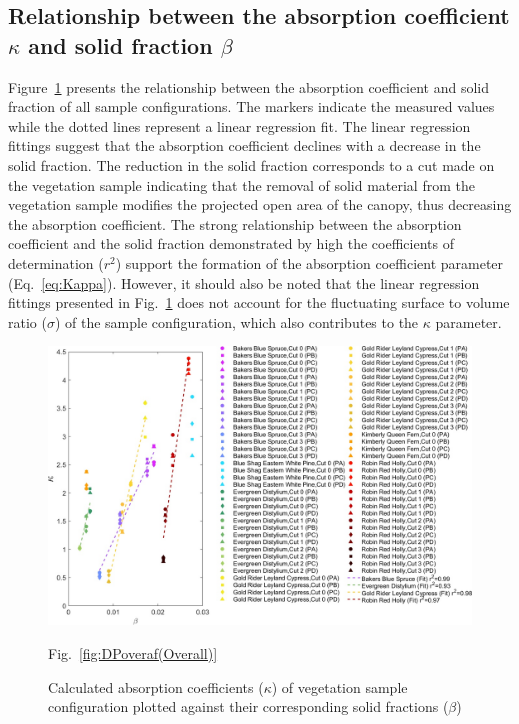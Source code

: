 \documentclass[12pt]{article}
\begin{document}
\subsection{Relationship between the absorption coefficient $\kappa$ and solid fraction $\beta$ }

Figure~\ref{fig:betavkappa} presents the relationship between the absorption coefficient and solid fraction of all sample configurations. The markers indicate the measured values while the dotted lines represent a linear regression fit. The linear regression fittings suggest that the absorption coefficient declines with a decrease in the solid fraction. The reduction in the solid fraction corresponds to a cut made on the vegetation sample indicating that the removal of solid material from the vegetation sample modifies the projected open area of the canopy, thus decreasing the absorption coefficient. The strong relationship between the absorption coefficient and the solid fraction demonstrated by high the coefficients of determination ($r^2$) support the formation of the absorption coefficient parameter (Eq.~\ref{eq:Kappa}). However, it should also be noted that the linear regression fittings presented in Fig.~\ref{fig:betavkappa} does not account for the fluctuating surface to volume ratio ($\sigma$) of the sample configuration, which also contributes to the $\kappa$ parameter.

\begin{figure}
	\centering 	\includegraphics[width=1.1\linewidth]{Picture12.jpg}
	\caption{Calculated absorption coefficients ($\kappa$) of vegetation sample configuration plotted against their corresponding solid fractions ($\beta$) } Fig.~\ref{fig:DPoveraf(Overall)}
	\label{fig:betavkappa}
\end{figure}
\end{document}
